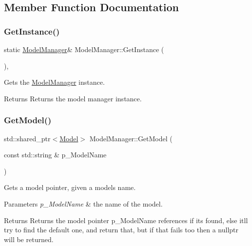 \subsection{Member Function Documentation}
\mbox{\label{class_model_manager_a8d009d3630426c44e634bfccc92004b2}} 
\subsubsection{\texorpdfstring{GetInstance()}{GetInstance()}}
{\footnotesize\ttfamily static \mbox{\hyperlink{class_model_manager}{Model\+Manager}}\& Model\+Manager\+::\+Get\+Instance (\begin{DoxyParamCaption}{ }\end{DoxyParamCaption})\hspace{0.3cm}{\ttfamily [inline]}, {\ttfamily [static]}}



Gets the \mbox{\hyperlink{class_model_manager}{Model\+Manager}} instance. 

\begin{DoxyReturn}{Returns}
Returns the model manager instance. 
\end{DoxyReturn}
\mbox{\label{class_model_manager_a9bb6cee3ce0f0665de35df41fe78a49d}} 
\subsubsection{\texorpdfstring{GetModel()}{GetModel()}}
{\footnotesize\ttfamily std\+::shared\+\_\+ptr$<$\mbox{\hyperlink{class_model}{Model}}$>$ Model\+Manager\+::\+Get\+Model (\begin{DoxyParamCaption}\item[{const std\+::string \&}]{p\+\_\+\+Model\+Name }\end{DoxyParamCaption})\hspace{0.3cm}{\ttfamily [inline]}}



Gets a model pointer, given a model\textquotesingle{}s name. 


\begin{DoxyParams}{Parameters}
{\em p\+\_\+\+Model\+Name} & the name of the model. \\
\hline
\end{DoxyParams}
\begin{DoxyReturn}{Returns}
Returns the model pointer p\+\_\+\+Model\+Name references if it\textquotesingle{}s found, else it\textquotesingle{}ll try to find the default one, and return that, but if that fails too then a nullptr will be returned. 
\end{DoxyReturn}
\mbox{\label{class_model_manager_a78e2c64a9e221d209559d3cb7a961994}} 
